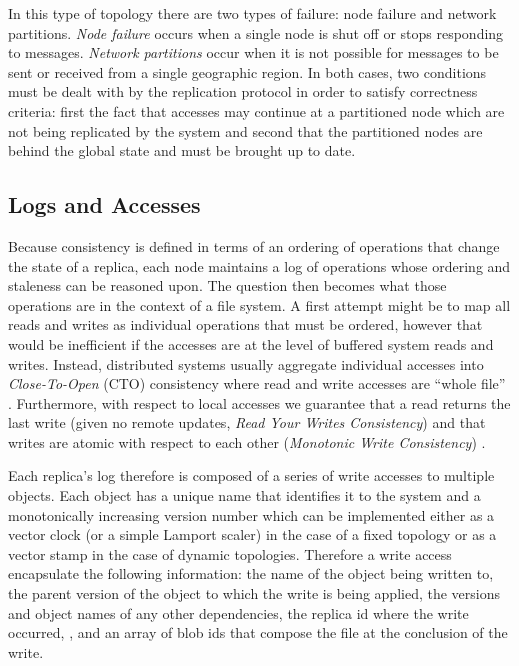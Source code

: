 \documentclass[10pt,conference,compsocconf,letterpaper]{IEEEtran}
\begin{document}
In this type of topology there are two types of failure: node failure and network partitions. \textit{Node failure} occurs when a single node is shut off or stops responding to messages. \textit{Network partitions} occur when it is not possible for messages to be sent or received from a single geographic region. In both cases, two conditions must be dealt with by the replication protocol in order to satisfy correctness criteria: first the fact that accesses may continue at a partitioned node which are not being replicated by the system and second that the partitioned nodes are behind the global state and must be brought up to date.

\subsection{Logs and Accesses}

Because consistency is defined in terms of an ordering of operations that change the state of a replica, each node maintains a log of operations whose ordering and staleness can be reasoned upon. The question then becomes what those operations are in the context of a file system. A first attempt might be to map all reads and writes as individual operations that must be ordered, however that would be inefficient if the accesses are at the level of buffered system reads and writes. Instead, distributed systems usually aggregate individual accesses into \textit{Close-To-Open} (CTO) consistency where read and write accesses are ``whole file'' \cite{muthitacharoen_low-bandwidth_2001}. Furthermore, with respect to local accesses we guarantee that a read returns the last write (given no remote updates, \textit{Read Your Writes Consistency}) and that writes are atomic with respect to each other (\textit{Monotonic Write Consistency}) \cite{bermbach_consistency_2013}.

Each replica's log therefore is composed of a series of write accesses to multiple objects. Each object has a unique name that identifies it to the system and a monotonically increasing version number which can be implemented either as a vector clock \cite{parker_detection_1983} (or a simple Lamport scaler) in the case of a fixed topology or as a vector stamp \cite{almeida_version_2002} in the case of dynamic topologies. Therefore a write access encapsulate the following information: the name of the object being written to, the parent version of the object to which the write is being applied, the versions and object names of any other dependencies, the replica id where the write occurred, , and an array of blob ids that compose the file at the conclusion of the write.
\end{document}
